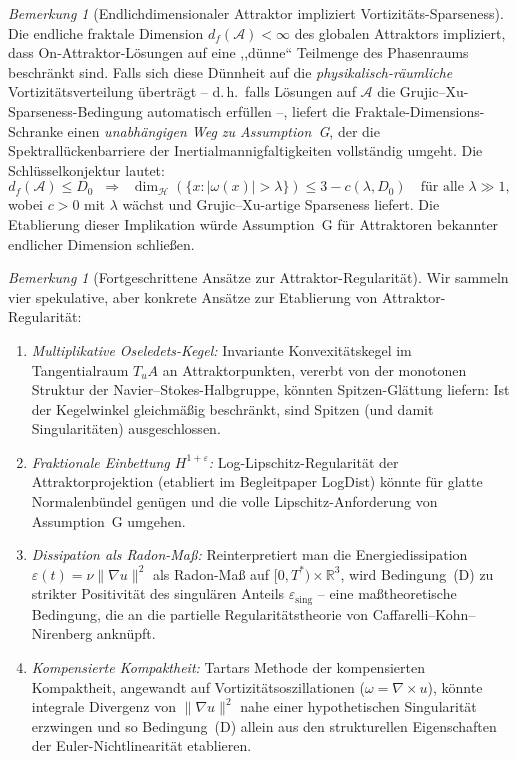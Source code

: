 \documentclass[12pt,a4paper]{article}
\theoremstyle{definition}
\theoremstyle{plain}
\theoremstyle{remark}
\newtheorem{remark}[definition]{Bemerkung}
\begin{document}
\begin{remark}[Endlichdimensionaler Attraktor impliziert
Vortizitäts-Sparseness]
\label{rem:attractor-sparseness}
Die endliche fraktale Dimension $d_f(\mathcal{A}) < \infty$ des globalen
Attraktors impliziert, dass On-Attraktor-Lösungen auf eine ,,dünne``
Teilmenge des Phasenraums beschränkt sind. Falls sich diese Dünnheit
auf die \emph{physikalisch-räumliche} Vortizitätsverteilung
überträgt -- d.\,h.\ falls Lösungen auf $\mathcal{A}$ die
Grujic--Xu-Sparseness-Bedingung automatisch erfüllen --, liefert die
Fraktale-Dimensions-Schranke einen \emph{unabhängigen Weg zu
Assumption~G}, der die Spektrallückenbarriere der
Inertialmannigfaltigkeiten vollständig umgeht. Die Schlüsselkonjektur
lautet:
\[
  d_f(\mathcal{A}) \leq D_0
  \;\;\Longrightarrow\;\;
  \dim_{\mathcal{H}}(\{x : |\omega(x)| > \lambda\})
  \leq 3 - c(\lambda, D_0)
  \quad\text{für alle } \lambda \gg 1,
\]
wobei $c > 0$ mit $\lambda$ wächst und Grujic--Xu-artige Sparseness
liefert. Die Etablierung dieser Implikation würde Assumption~G für
Attraktoren bekannter endlicher Dimension schließen.
\end{remark}

\begin{remark}[Fortgeschrittene Ansätze zur Attraktor-Regularität]
\label{rem:advanced-attractor}
Wir sammeln vier spekulative, aber konkrete Ansätze zur Etablierung von Attraktor-Regularität:
\begin{enumerate}
\item \emph{Multiplikative Oseledets-Kegel:} Invariante Konvexitätskegel im Tangentialraum $T_u A$ an Attraktorpunkten, vererbt von der monotonen Struktur der Navier--Stokes-Halbgruppe, könnten Spitzen-Glättung liefern: Ist der Kegelwinkel gleichmäßig beschränkt, sind Spitzen (und damit Singularitäten) ausgeschlossen.
\item \emph{Fraktionale Einbettung $H^{1+\varepsilon}$:} Log-Lipschitz-Regularität der Attraktorprojektion (etabliert im Begleitpaper LogDist) könnte für glatte Normalenbündel genügen und die volle Lipschitz-Anforderung von Assumption~G umgehen.
\item \emph{Dissipation als Radon-Maß:} Reinterpretiert man die Energiedissipation $\varepsilon(t) = \nu \|\nabla u\|^2$ als Radon-Maß auf $[0, T^*) \times \mathbb{R}^3$, wird Bedingung~(D) zu strikter Positivität des singulären Anteils $\varepsilon_{\mathrm{sing}}$ -- eine maßtheoretische Bedingung, die an die partielle Regularitätstheorie von Caffarelli--Kohn--Nirenberg anknüpft.
\item \emph{Kompensierte Kompaktheit:} Tartars Methode der kompensierten Kompaktheit, angewandt auf Vortizitätsoszillationen ($\omega = \nabla \times u$), könnte integrale Divergenz von $\|\nabla u\|^2$ nahe einer hypothetischen Singularität erzwingen und so Bedingung~(D) allein aus den strukturellen Eigenschaften der Euler-Nichtlinearität etablieren.
\end{enumerate}
\end{remark}
\end{document}
